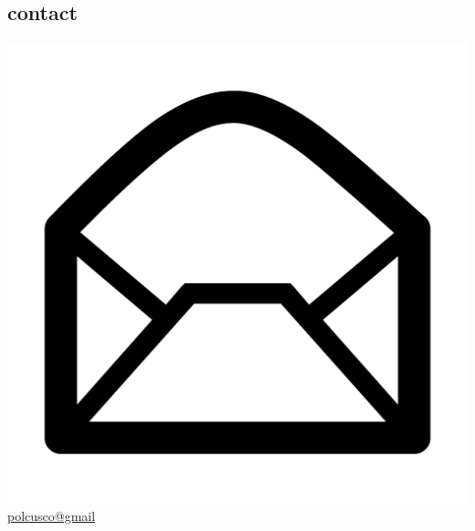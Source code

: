 \documentclass[]{friggeri-cv} %
\begin{document}



\begin{aside} %
  \section{contact}
  \includegraphics[scale=0.03]{emaillogo.jpeg}
  \href{mailto:polcusco@gmail.com}{polcusco@gmail}

\end{aside}
\end{document}

